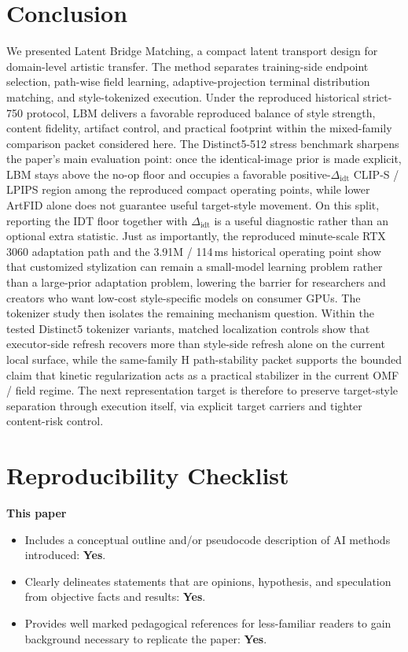 \documentclass[letterpaper]{article}
\begin{document}
\section{Conclusion}
We presented Latent Bridge Matching, a compact latent transport design for domain-level artistic transfer. The method separates training-side endpoint selection, path-wise field learning, adaptive-projection terminal distribution matching, and style-tokenized execution. Under the reproduced historical strict-750 protocol, LBM delivers a favorable reproduced balance of style strength, content fidelity, artifact control, and practical footprint within the mixed-family comparison packet considered here. The Distinct5-512 stress benchmark sharpens the paper's main evaluation point: once the identical-image prior is made explicit, LBM stays above the no-op floor and occupies a favorable positive-$\Delta_{\mathrm{idt}}$ CLIP-S / LPIPS region among the reproduced compact operating points, while lower ArtFID alone does not guarantee useful target-style movement. On this split, reporting the IDT floor together with $\Delta_{\mathrm{idt}}$ is a useful diagnostic rather than an optional extra statistic. Just as importantly, the reproduced minute-scale RTX 3060 adaptation path and the 3.91M / 114\,ms historical operating point show that customized stylization can remain a small-model learning problem rather than a large-prior adaptation problem, lowering the barrier for researchers and creators who want low-cost style-specific models on consumer GPUs. The tokenizer study then isolates the remaining mechanism question. Within the tested Distinct5 tokenizer variants, matched localization controls show that executor-side refresh recovers more than style-side refresh alone on the current local surface, while the same-family H path-stability packet supports the bounded claim that kinetic regularization acts as a practical stabilizer in the current OMF / field regime. The next representation target is therefore to preserve target-style separation through execution itself, via explicit target carriers and tighter content-risk control.



\small
\setlength{\itemsep}{1pt}
\setlength{\parskip}{2pt}
\section*{Reproducibility Checklist}
\noindent\textbf{This paper}
\begin{itemize}
\item Includes a conceptual outline and/or pseudocode description of AI methods introduced: \textbf{Yes}.
\item Clearly delineates statements that are opinions, hypothesis, and speculation from objective facts and results: \textbf{Yes}.
\item Provides well marked pedagogical references for less-familiar readers to gain background necessary to replicate the paper: \textbf{Yes}.
\end{itemize}
\end{document}
